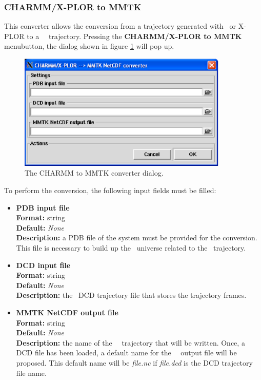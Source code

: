 \documentclass[a4paper,11pt]{report}
\begin{document}
\subsubsection{CHARMM/X-PLOR to MMTK}
\label{charmm_to_mmtk}
This converter allows the conversion from a trajectory generated with \CHARMM\ or X-PLOR \cite{CHARMM,X-PLOR} to a 
\MMTK\ \NetCDF\ trajectory. Pressing the \textbf{CHARMM/X-PLOR to MMTK} menubutton, the dialog shown in figure \ref{fig:charmm_converter} will pop up.
\begin{figure}[h!]
\begin{center}
\includegraphics[width=10cm]{Figures/charmm_converter.eps}
\end{center}
\caption[The CHARMM to MMTK converter dialog]{The CHARMM to MMTK converter dialog.}
\label{fig:charmm_converter}
\end{figure}   

To perform the conversion, the following input fields must be filled:
\hypertarget{charmm_converter_pdb_input_file}{}
\begin{itemize}
\item \textbf{PDB input file}\\
\textbf{Format:} string\\
\textbf{Default:} \textit{None}\\
\textbf{Description:} a PDB file of the system must be provided for the conversion. This file is necessary to build up 
the \MMTK\ universe related to the \MMTK\ trajectory. 

\hypertarget{charmm_converter_dcd_input_file}{}
\item \textbf{DCD input file}\\
\textbf{Format:} string\\
\textbf{Default:} \textit{None}\\
\textbf{Description:} the \CHARMM\ DCD trajectory file that stores the trajectory frames.

\hypertarget{charmm_converter_mmtk_netcdf_output_file}{}
\item \textbf{MMTK NetCDF output file}\\
\textbf{Format:} string\\
\textbf{Default:} \textit{None}\\
\textbf{Description:} the name of the \MMTK\ \NetCDF\ trajectory that will be written. Once, a DCD file has been 
loaded, a default name for the \MMTK\ \NetCDF\ output file will be proposed. This default name will be 
\textit{file.nc} if \textit{file.dcd} is the DCD trajectory file name.
\end{itemize}
\end{document}
